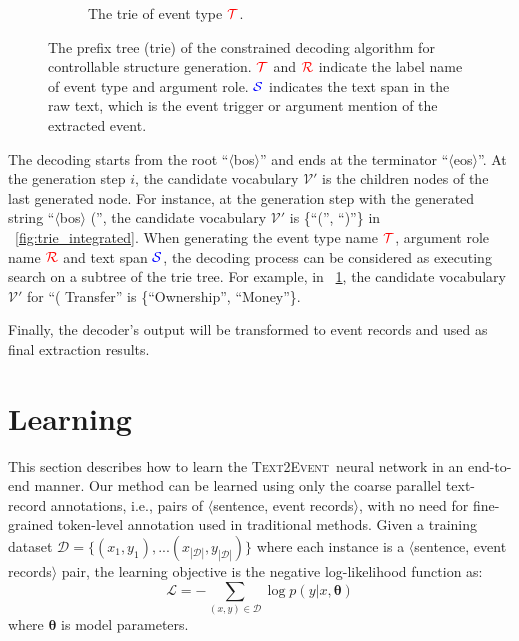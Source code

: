 \documentclass[11pt,a4paper]{article}
\newcommand\modelname{\textsc{Text2Event}}
\begin{document}
\begin{figure}[!tphb]
\bigskip

\begin{subfigure}[b]{0.35\textwidth}
    \caption{The trie of event type ${\color{red}\mathcal{T}}$.}
    \label{fig:event_type_decoding}
\end{subfigure}

\caption{
  The prefix tree (trie) of the constrained decoding algorithm for controllable structure generation.
  ${\color{red}\mathcal{T}}$ and ${\color{red}\mathcal{R}}$ indicate the label name of event type and argument role.
  ${\color{blue}\mathcal{S}}$ indicates the text span in the raw text, which is the event trigger or argument mention of the extracted event.
}
\label{fig:decoding_stage}
\end{figure} 

The decoding starts from the root ``$\langle$bos$\rangle$'' and ends at the terminator ``$\langle$eos$\rangle$''.
At the generation step $i$, the candidate vocabulary $\mathcal{V}'$ is the children nodes of the last generated node.
For instance, at the generation step with the generated string ``$\langle$bos$\rangle$ ('', the candidate vocabulary $\mathcal{V}'$ is \{``('', ``)''\} in \figurename~\ref{fig:trie_integrated}.
When generating the event type name ${\color{red}\mathcal{T}}$, argument role name ${\color{red}\mathcal{R}}$ and text span ${\color{blue}\mathcal{S}}$, the decoding process can be considered as executing search on a subtree of the trie tree.
For example, in \figurename~\ref{fig:event_type_decoding}, the candidate vocabulary $\mathcal{V}'$ for ``( Transfer'' is \{``Ownership'', ``Money''\}.

Finally,  the decoder's output will be transformed to event records and used as final extraction results.
 
\section{Learning} \label{sec:learning}
This section describes how to learn the \modelname\, neural network in an end-to-end manner.
Our method can be learned using only the coarse parallel text-record annotations, i.e., pairs of $\langle$sentence, event records$\rangle$, with no need for fine-grained token-level annotation used in traditional methods.
Given a training dataset $\mathcal{D} = \{(x_{1}, y_{1}), ...(x_{|\mathcal{D}|}, y_{|\mathcal{D}|})\}$ where each instance is a $\langle$sentence, event records$\rangle$ pair, the learning objective is the negative log-likelihood function as:
\begin{equation}
    \label{equ:base_loss_function}
    \mathcal{L} = - \sum_{(x,y)\in\mathcal{D}} \log p(y|x,\mathbf{\theta})
\end{equation}
where $\mathbf{\theta}$ is model parameters.
\end{document}

